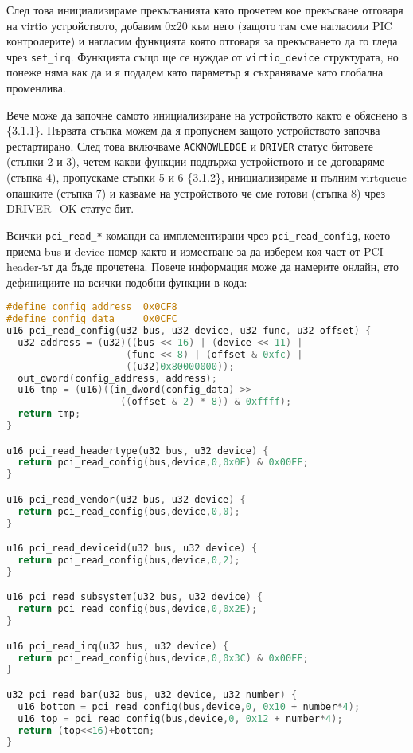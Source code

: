 След това инициализираме прекъсванията като прочетем кое прекъсване отговаря на virtio устройството, добавим 0x20 към него (защото там сме нагласили PIC контролерите) и нагласим функцията която отговаря за прекъсването да го гледа чрез {\tt set\_irq}. Функцията също ще се нуждае от {\tt virtio\_device} структурата, но понеже няма как да и я подадем като параметър я съхраняваме като глобална променлива.

Вече може да започне самото инициализиране на устройството както е обяснено в \{3.1.1\}. Първата стъпка можем да я пропуснем защото устройството започва рестартирано. След това включваме {\tt ACKNOWLEDGE} и {\tt DRIVER} статус битовете (стъпки 2 и 3), четем какви функции поддържа устройството и се договаряме (стъпка 4), пропускаме стъпки 5 и 6 \{3.1.2\}, инициализираме и пълним virtqueue опашките (стъпка 7) и казваме на устройството че сме готови (стъпка 8) чрез DRIVER\_OK статус бит.

Всички {\tt pci\_read\_*} команди са имплементирани чрез {\tt pci\_read\_config}, което приема bus и device номер както и изместване за да изберем коя част от PCI header-ът да бъде прочетена. Повече информация може да намерите онлайн\parencite{pciheader}, ето дефинициите на всички подобни функции в кода:
\begin{lstlisting}[language=C]
#define config_address  0x0CF8
#define config_data     0x0CFC
u16 pci_read_config(u32 bus, u32 device, u32 func, u32 offset) {
  u32 address = (u32)((bus << 16) | (device << 11) |
                     (func << 8) | (offset & 0xfc) |
                     ((u32)0x80000000));
  out_dword(config_address, address);
  u16 tmp = (u16)((in_dword(config_data) >>
                    ((offset & 2) * 8)) & 0xffff);
  return tmp;
}

u16 pci_read_headertype(u32 bus, u32 device) {
  return pci_read_config(bus,device,0,0x0E) & 0x00FF;
}

u16 pci_read_vendor(u32 bus, u32 device) {
  return pci_read_config(bus,device,0,0);
}

u16 pci_read_deviceid(u32 bus, u32 device) {
  return pci_read_config(bus,device,0,2);
}

u16 pci_read_subsystem(u32 bus, u32 device) {
  return pci_read_config(bus,device,0,0x2E);
}

u16 pci_read_irq(u32 bus, u32 device) {
  return pci_read_config(bus,device,0,0x3C) & 0x00FF;
}

u32 pci_read_bar(u32 bus, u32 device, u32 number) {
  u16 bottom = pci_read_config(bus,device,0, 0x10 + number*4);
  u16 top = pci_read_config(bus,device,0, 0x12 + number*4);
  return (top<<16)+bottom;
}
\end{lstlisting}

